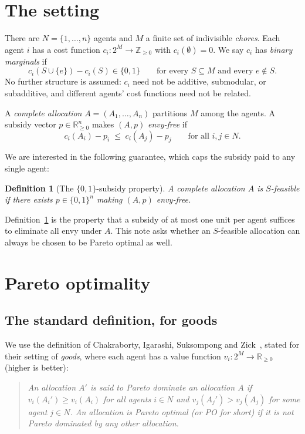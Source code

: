 \documentclass[11pt]{article}
\newtheorem{definition}{Definition}[section]
\newcommand{\N}{N}
\newcommand{\Mset}{M}
\begin{document}
\section{The setting}
\label{sec:setting}

There are $\N = \{1,\dots,n\}$ agents and $\Mset$ a finite set of indivisible
\emph{chores}. Each agent $i$ has a cost function $c_i : 2^{\Mset} \to
\mathbb{Z}_{\ge 0}$ with $c_i(\emptyset) = 0$. We say $c_i$ has \emph{binary
marginals} if
\[
  c_i(S \cup \{e\}) - c_i(S) \in \{0,1\}
  \qquad \text{for every } S \subseteq \Mset \text{ and every } e \notin S.
\]
No further structure is assumed: $c_i$ need not be additive, submodular, or
subadditive, and different agents' cost functions need not be related.

A \emph{complete allocation} $A = (A_1,\dots,A_n)$ partitions $\Mset$ among
the agents. A subsidy vector $p \in \mathbb{R}^n_{\ge 0}$ makes $(A,p)$
\emph{envy-free} if
\[
  c_i(A_i) - p_i \;\le\; c_i(A_j) - p_j \qquad \text{for all } i,j \in \N .
\]

We are interested in the following guarantee, which caps the subsidy paid to
any single agent:
\begin{definition}[The $\{0,1\}$-subsidy property]
\label{def:S}
A complete allocation $A$ is \emph{$S$-feasible} if there exists
$p \in \{0,1\}^n$ making $(A,p)$ envy-free.
\end{definition}
Definition~\ref{def:S} is the property that a subsidy of at most one unit per
agent suffices to eliminate all envy under $A$. This note asks whether an
$S$-feasible allocation can always be chosen to be Pareto optimal as well.

\section{Pareto optimality}
\label{sec:po}

\subsection{The standard definition, for goods}

We use the definition of Chakraborty, Igarashi, Suksompong and
Zick~\cite[Sec.~2]{CISZ21}, stated for their setting of \emph{goods}, where
each agent has a value function $v_i : 2^{\Mset} \to \mathbb{R}_{\ge 0}$
(higher is better):

\begin{quote}
\emph{An allocation $A'$ is said to Pareto dominate an allocation $A$ if
$v_i(A_i') \ge v_i(A_i)$ for all agents $i \in \N$ and $v_j(A_j') > v_j(A_j)$
for some agent $j \in \N$. An allocation is Pareto optimal (or PO for short)
if it is not Pareto dominated by any other allocation.}
\end{quote}
\end{document}
